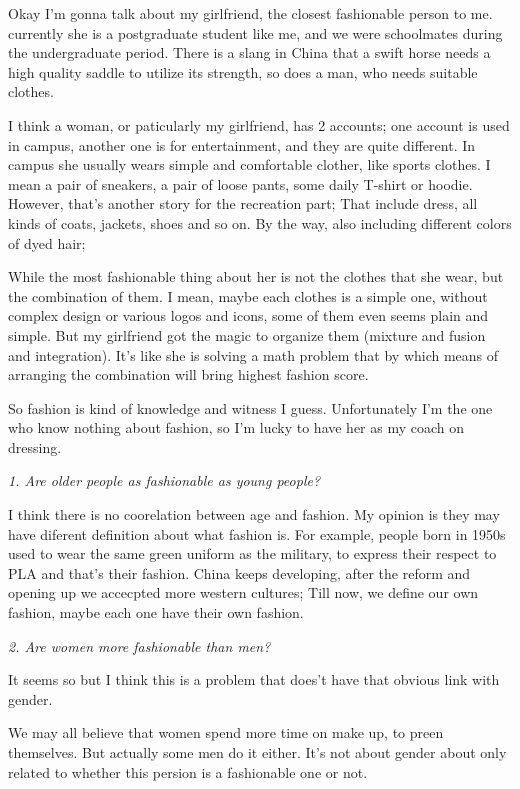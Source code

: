 \documentclass[conference]{IEEEtran}
\begin{document}
Okay I'm gonna talk about my girlfriend, the closest fashionable person to me.
currently she is a postgraduate student like me, and we were schoolmates during the undergraduate period.
There is a slang in China that a swift horse needs a high quality saddle to utilize its strength, so does a man, 
who needs suitable clothes.

I think a woman, or paticularly my girlfriend, has 2 accounts;
one account is used in campus, another one is for entertainment, and they are quite different.
In campus she usually wears simple and comfortable clother, like sports clothes.
I mean a pair of sneakers, a pair of loose pants, some daily T-shirt or hoodie.
However, that's another story for the recreation part;
That include dress, all kinds of coats, jackets, shoes and so on.
By the way, also including different colors of dyed hair;

While the most fashionable thing about her is not the clothes that she wear, but the combination of them.
I mean, maybe each clothes is a simple one, without complex design or various logos and icons, some of
them even seems plain and simple.
But my girlfriend got the magic to organize them (mixture and fusion and integration).
It's like she is solving a math problem that by which means of arranging the combination will bring highest fashion score.

So fashion is kind of knowledge and witness I guess.
Unfortunately I'm the one who know nothing about fashion, so I'm lucky to have her as my coach on dressing.

\textit{1. Are older people as fashionable as young people?}

I think there is no coorelation between age and fashion.
My opinion is they may have diferent definition about what fashion is.
For example, people born in 1950s used to wear the same green uniform as the military,
to express their respect to PLA and that's their fashion.
China keeps developing, after the reform and opening up we accecpted more western cultures;
Till now, we define our own fashion, maybe each one have their own fashion.

\textit{2. Are women more fashionable than men?}

It seems so but I think this is a problem that does't have that obvious link with gender.

We may all believe that women spend more time on make up, to preen themselves.
But actually some men do it either.
It's not about gender about only related to whether this persion is a fashionable one or not.
\end{document}
